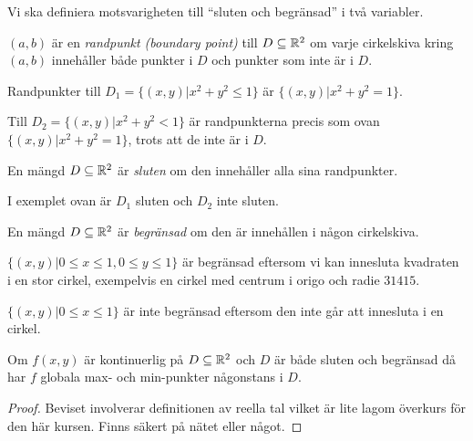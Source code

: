 \documentclass[a4paper]{article}
\begin{document}
Vi ska definiera motsvarigheten till \enquote{sluten och begränsad} i 
två variabler.

\begin{defn}[Randpunkter]
    \(
        (a,b)
    \) är en \emph{randpunkt (boundary point)} till \(
        D \subseteq \mathbb{R}^2
    \) om varje cirkelskiva kring \(
        (a,b)
    \) innehåller både punkter i \(
        D
    \) och punkter som inte är i \(
        D
    \).
\end{defn}

\begin{ex}
    Randpunkter till \(
        D_1 = \{ (x,y) | x^2+y^2 \leq 1 \}
    \) är \(
        \{(x,y) | x^2+y^2 = 1\}
    \).

    Till \(
        D_2 = \{ (x,y) | x^2+y^2 < 1 \}
    \) är randpunkterna precis som ovan \(
        \{(x,y) | x^2+y^2 = 1\}
    \), trots att de inte är i \(
        D
    \).
\end{ex}


\begin{defn}
    En mängd \(
        D \subseteq \mathbb{R}^2
    \) är \emph{sluten} om den innehåller alla sina randpunkter.
\end{defn}

I exemplet ovan är \(
    D_1
\) sluten och \(
    D_2
\) inte sluten.

\begin{defn}
    En mängd \(
        D \subseteq \mathbb{R}^2
    \) är \emph{begränsad} om den är innehållen i någon cirkelskiva.
\end{defn}

\begin{ex}
    \(
        \{(x,y) | 0 \leq x \leq 1, 0 \leq y \leq 1\}
    \) är begränsad eftersom vi kan innesluta kvadraten i en stor cirkel,
    exempelvis en cirkel med centrum i origo och radie \(
        31415
    \).

    \(
        \{(x,y) | 0 \leq x \leq 1\}
    \) är inte begränsad eftersom den inte går att innesluta i en cirkel.
\end{ex}

\begin{sats}
    Om \(
        f(x,y)
    \) är kontinuerlig på \(
        D \subseteq \mathbb{R}^2
    \) och \(
        D
    \) är både sluten och begränsad då har \(
        f
    \) globala max- och min-punkter någonstans i \(
        D
    \).

    \begin{proof}
        Beviset involverar definitionen av reella tal vilket är lite lagom 
        överkurs för den här kursen. Finns säkert på nätet eller något.
    \end{proof}
\end{sats}
\end{document}
